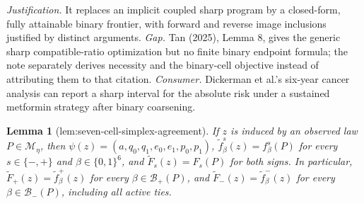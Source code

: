 \documentclass{article}
\newtheorem{lemma}{Lemma}
\begin{document}
\par\smallskip\noindent \textit{Justification.} It replaces an implicit coupled sharp program by a closed-form, fully attainable binary frontier, with forward and reverse image inclusions justified by distinct arguments. \textit{Gap.} Tan (2025), Lemma 8, gives the generic sharp compatible-ratio optimization but no finite binary endpoint formula; the note separately derives necessity and the binary-cell objective instead of attributing them to that citation. \textit{Consumer.} Dickerman et al.'s six-year cancer analysis can report a sharp interval for the absolute risk under a sustained metformin strategy after binary coarsening.

\begin{lemma}[lem:seven-cell-simplex-agreement]\label{lem:seven-cell-simplex-agreement}
If \(z\) is induced by an observed law \(P\in\mathcal M_\eta\), then \(\psi(z)=(a,q_0,q_1,e_0,e_1,p_0,p_1)\), \(\widetilde f_\beta^s(z)=f_\beta^s(P)\) for every \(s\in\{-,+\}\) and \(\beta\in\{0,1\}^6\), and \(\widetilde F_s(z)=F_s(P)\) for both signs. In particular, \(\widetilde F_+(z)=\widetilde f_\beta^+(z)\) for every \(\beta\in\mathcal B_+(P)\), and \(\widetilde F_-(z)=\widetilde f_\beta^-(z)\) for every \(\beta\in\mathcal B_-(P)\), including all active ties.
\end{lemma}
\end{document}

